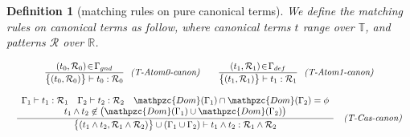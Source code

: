 \documentclass[12pt]{article}
\newtheorem{Definition}{Definition}[section]
\begin{document}
\pagebreak
\begin{Definition}[matching rules on pure canonical terms]
  We define the matching rules on canonical terms as follow,
  where canonical terms $t$ range over $\mathbb{T}$, and patterns
  $\mathcal{R}$ over $\mathbb{R}$.
  
  \begin{displaymath}
    \begin{array}{c}
      
      \begin{array}{rl}
        \begin{array}{rl}
          \dfrac{
            (t_0, \mathcal{R}_0) \!\in\! \Gamma_{gnd}
          }{
            \bigl\{(t_0, \mathcal{R}_0) \bigr\} \vdash t_0 : \mathcal{R}_0
          }  &  \!\! \text{\it (T-Atom0-canon)}
        \end{array}
        
        & \begin{array}{rl}
            \dfrac{
              (t_1, \mathcal{R}_1) \!\in\! \Gamma_{def}
            }{
              \bigl\{(t_1, \mathcal{R}_1) \bigr\} \vdash t_1 : \mathcal{R}_1
            }  &  \!\! \text{\it (T-Atom1-canon)}
          \end{array}
      \end{array}  \\
      \\
      
      \begin{array}{rl}
        \dfrac{
          \begin{array}{c}
            \Gamma_1 \vdash t_1 : \mathcal{R}_1
             \quad \Gamma_2 \vdash t_2 : \mathcal{R}_2
              \quad \mathpzc{Dom}(\Gamma_1) \cap \mathpzc{Dom}(\Gamma_2)
              = \phi  \\
              t_1 \wedge t_2 \not\in \bigl(\mathpzc{Dom}(\Gamma_1) \cup
               \mathpzc{Dom}(\Gamma_2) \bigr)
          \end{array}
        }{
          \bigl\{(t_1 \wedge t_2, \mathcal{R}_1 \wedge \mathcal{R}_2)
           \bigr\} \cup (\Gamma_1 \cup \Gamma_2) \vdash
            t_1 \wedge t_2 : \mathcal{R}_1 \wedge \mathcal{R}_2
        }  &  \text{\it (T-Cas-canon)}  \\
        \\
        

\end{array}
\end{array}
\end{displaymath}
\end{Definition}
\end{document}
